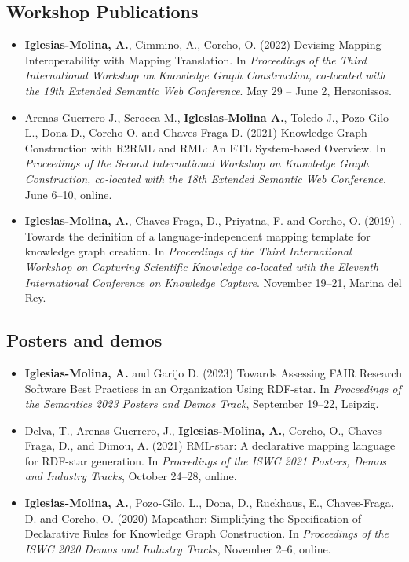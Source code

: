 \subsection{Workshop Publications}
\begin{itemize}
    \item \textbf{Iglesias-Molina, A.}, Cimmino, A., Corcho, O. (2022) Devising Mapping Interoperability with Mapping Translation. In \textit{Proceedings of the Third International Workshop on Knowledge Graph Construction, co-located with the 19th Extended Semantic Web Conference}. May 29 -- June 2, Hersonissos. 

    \item Arenas-Guerrero J., Scrocca M., \textbf{Iglesias-Molina A.}, Toledo J., Pozo-Gilo L., Dona D., Corcho O. and Chaves-Fraga D. (2021) Knowledge Graph Construction with R2RML and RML: An ETL System-based Overview. In \textit{Proceedings of the Second International Workshop on Knowledge Graph Construction, co-located with the 18th Extended Semantic Web Conference}. June 6--10, online.
    
    \item \textbf{Iglesias-Molina, A.}, Chaves-Fraga, D., Priyatna, F. and Corcho, O. (2019) . Towards the definition of a language-independent mapping template for knowledge graph creation. In \textit{Proceedings of the Third International Workshop on Capturing Scientific Knowledge co-located with the Eleventh International Conference on Knowledge Capture}. November 19--21, Marina del Rey.
\end{itemize}

\subsection{Posters and demos}
\begin{itemize}
    \item \textbf{Iglesias-Molina, A.} and Garijo D. (2023) Towards Assessing FAIR Research Software Best Practices in an Organization Using RDF-star. In \textit{Proceedings of the Semantics 2023 Posters and Demos Track}, September 19--22, Leipzig.
    
    \item Delva, T., Arenas-Guerrero, J., \textbf{Iglesias-Molina, A.}, Corcho, O., Chaves-Fraga, D., and Dimou, A. (2021) RML-star: A declarative mapping language for RDF-star generation. In \textit{Proceedings of the ISWC 2021 Posters, Demos and Industry Tracks}, October 24--28, online.

    \item \textbf{Iglesias-Molina, A.}, Pozo-Gilo, L., Dona, D., Ruckhaus, E., Chaves-Fraga, D. and Corcho, O. (2020) Mapeathor: Simplifying the Specification of Declarative Rules for Knowledge Graph Construction. In \textit{Proceedings of the ISWC 2020 Demos and Industry Tracks}, November 2--6, online.
\end{itemize}


